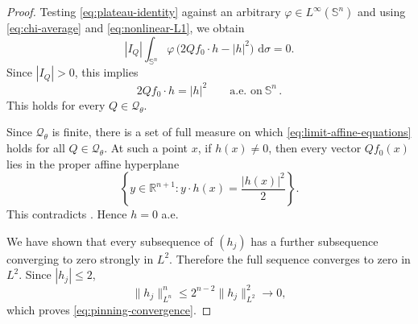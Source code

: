 \documentclass[10pt,a4paper]{amsart}
\newcommand{\R}{\mathbb R}
\newcommand{\Sph}{\mathbb S}
\newcommand{\dd}{\,\mathrm d}
\begin{document}
\begin{proof}
Testing \eqref{eq:plateau-identity} against an arbitrary $\varphi\in L^\infty(\Sph^n)$ and using \eqref{eq:chi-average} and \eqref{eq:nonlinear-L1}, we obtain
\[
  |I_Q|\int_{\Sph^n}\varphi\,\bigl(2Qf_0\cdot h-|h|^2\bigr)\,\dd\sigma=0.
\]
Since $|I_Q|>0$, this implies
\begin{equation}\label{eq:limit-affine-equations}
  2Qf_0\cdot h=|h|^2
  \qquad\text{a.e.~on}\ \Sph^n \,.
\end{equation}
This holds for every $Q\in\mathcal Q_\theta$.

Since $\mathcal Q_\theta$ is finite, there is a set of full measure on which \eqref{eq:limit-affine-equations} holds for all $Q\in\mathcal Q_\theta$.  At such a point $x$, if $h(x)\ne0$, then every vector $Qf_0(x)$ lies in the proper affine hyperplane
\[
  \left\{y\in\R^{n+1}:y\cdot h(x)=\frac{|h(x)|^2}{2}\right\}.
\]
This contradicts .  Hence $h=0$ a.e.

We have shown that every subsequence of $(h_j)$ has a further subsequence converging to zero strongly in $L^2$.  Therefore the full sequence converges to zero in $L^2$.  Since $|h_j|\le2$,
\[
  \|h_j\|_{L^n}^n\le 2^{n-2}\|h_j\|_{L^2}^2\to0,
\]
which proves \eqref{eq:pinning-convergence}.
\end{proof}
\end{document}
